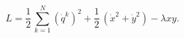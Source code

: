 \begin{equation}
L=\frac{1}{2}\,\sum\limits_{k=1}^{N}\left( \dot{q}^{k}\right) ^{2}+\frac{1}{2%
}\,\left( \dot{x}^{2}+\dot{y}^{2}\right) -\lambda xy.  \label{example}
\end{equation}

